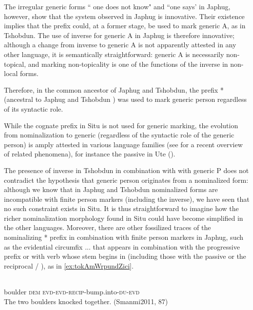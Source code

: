 The irregular generic  forms  `` one does not know" and  ``one says'  in Japhug, however, show that the system observed in Japhug is innovative. Their existence  implies that the prefix  could, at a former stage, be used to mark generic A, as in Tshobdun. The use of inverse  for generic A in Japhug is therefore innovative; although a change from inverse to generic A is not apparently attested in any other language, it is semantically straightforward: generic A is necessarily non-topical, and marking non-topicality is one of the functions of the inverse in non-local forms.

Therefore, in the common ancestor of Japhug and Tshobdun, the prefix * (ancestral to Japhug  and Tshobdun ) was used to mark generic person regardless of its syntactic role. 

While the cognate prefix  in Situ is not used for generic marking, the evolution from nominalization to generic (regardless of the syntactic role of the generic person) is amply attested in various language families (see \citealt{sanso14nmlz} for a recent overview of related phenomena), for instance the passive  in Ute (\citealt[264-7]{givon11ute}). %


The presence of inverse  in Tshobdun in combination with  with generic P does not contradict the hypothesis that generic person  originates from a nominalized form: although we know that in Japhug and Tshobdun nominalized forms are incompatible with finite person markers (including the inverse), we have seen that no such constraint exists in Situ. It is thus straightforward to imagine how the richer nominalization morphology found in Situ could have become simplified in the other languages. Moreover, there are other fossilized traces of the nominalizing * prefix in combination with finite person markers in Japhug, such as the evidential circumfix ... that appears in combination with the progressive  prefix or with verb whose stem begins in  (including those with the passive  or the reciprocal  / ), as in \ref{ex:tokAmWrpundZici}. 


\begin{exe}
\ex \label{ex:tokAmWrpundZici}
\gll {}  	  	  \\
boulder \textsc{dem} \textsc{evd}-\textsc{evd}-\textsc{recip}-bump.into-\textsc{du}-\textsc{evd} \\
\glt The two boulders knocked together. (Smanmi2011, 87)
\end{exe}


